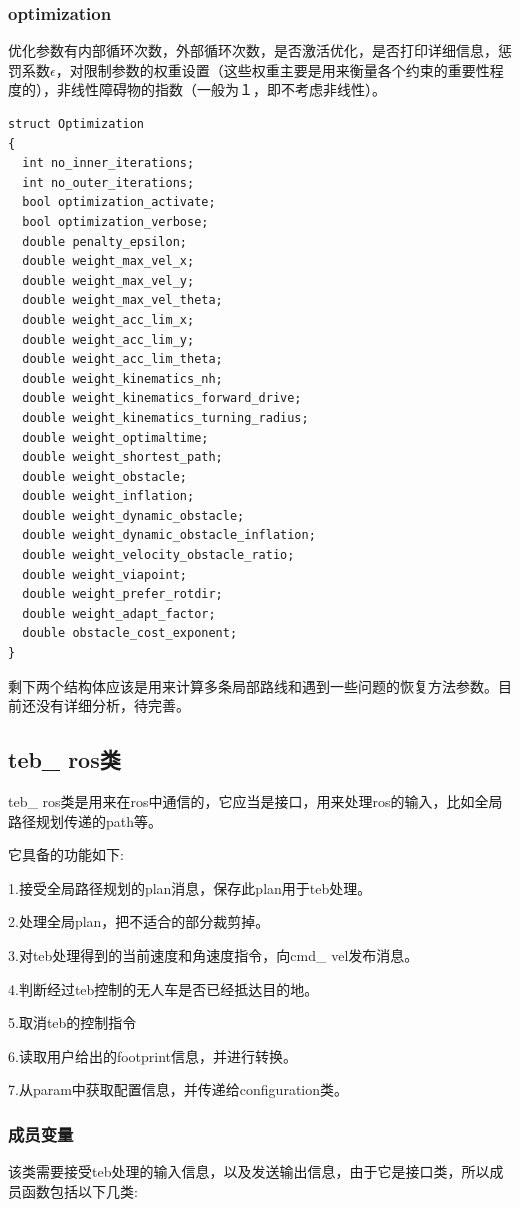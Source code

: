 \documentclass[10pt,a4paper]{article}
\theoremstyle{mythm}
\numberwithin{equation}{section}
\begin{document}
\subsubsection{optimization}
优化参数有内部循环次数，外部循环次数，是否激活优化，是否打印详细信息，惩罚系数$\epsilon$，对限制参数的权重设置（这些权重主要是用来衡量各个约束的重要性程度的），非线性障碍物的指数（一般为１，即不考虑非线性）。

\begin{lstlisting}[caption={Optimization结构体}]
struct Optimization
{
  int no_inner_iterations; 
  int no_outer_iterations;
  bool optimization_activate;
  bool optimization_verbose;
  double penalty_epsilon;
  double weight_max_vel_x;
  double weight_max_vel_y;
  double weight_max_vel_theta;
  double weight_acc_lim_x;
  double weight_acc_lim_y;
  double weight_acc_lim_theta;
  double weight_kinematics_nh;
  double weight_kinematics_forward_drive;
  double weight_kinematics_turning_radius;
  double weight_optimaltime;
  double weight_shortest_path;
  double weight_obstacle;
  double weight_inflation;
  double weight_dynamic_obstacle;
  double weight_dynamic_obstacle_inflation;
  double weight_velocity_obstacle_ratio;
  double weight_viapoint;
  double weight_prefer_rotdir;
  double weight_adapt_factor;
  double obstacle_cost_exponent;
}
\end{lstlisting}
剩下两个结构体应该是用来计算多条局部路线和遇到一些问题的恢复方法参数。目前还没有详细分析，待完善。
\subsection{teb\_ ros类}
teb\_ ros类是用来在ros中通信的，它应当是接口，用来处理ros的输入，比如全局路径规划传递的path等。

它具备的功能如下:

1.接受全局路径规划的plan消息，保存此plan用于teb处理。

2.处理全局plan，把不适合的部分裁剪掉。

3.对teb处理得到的当前速度和角速度指令，向cmd\_ vel发布消息。

4.判断经过teb控制的无人车是否已经抵达目的地。

5.取消teb的控制指令

6.读取用户给出的footprint信息，并进行转换。

7.从param中获取配置信息，并传递给configuration类。

\subsubsection{成员变量}
该类需要接受teb处理的输入信息，以及发送输出信息，由于它是接口类，所以成员函数包括以下几类:
\end{document}
